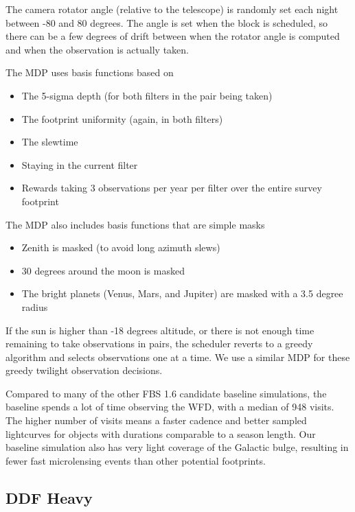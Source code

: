 The camera rotator angle (relative to the telescope) is randomly set each night between -80 and 80 degrees. The angle is set when the block is scheduled, so there can be a few degrees of drift between when the rotator angle is computed and when the observation is actually taken.

The MDP uses basis functions based on
\begin{itemize}
    \item{The 5-sigma depth (for both filters in the pair being taken)}
    \item{The footprint uniformity (again, in both filters)}
    \item{The slewtime}
    \item{Staying in the current filter}
    \item{Rewards taking 3 observations per year per filter over the entire survey footprint} 
\end{itemize}
The MDP also includes basis functions that are simple masks
\begin{itemize}
    \item{Zenith is masked (to avoid long azimuth slews)}
    \item{30 degrees around the moon is masked}
    \item{The bright planets (Venus, Mars, and Jupiter) are masked with a 3.5 degree radius}
\end{itemize}


If the sun is higher than -18 degrees altitude, or there is not enough time remaining to take observations in pairs, the scheduler reverts to a greedy algorithm and selects observations one at a time. We use a similar MDP for these greedy twilight observation decisions. 

Compared to many of the other FBS 1.6 candidate baseline simulations, the baseline spends a lot of time observing the WFD, with a median of 948 visits. The higher number of visits means a faster cadence and better sampled lightcurves for objects with durations comparable to a season length. Our baseline simulation also has very light coverage of the Galactic bulge, resulting in fewer fast microlensing events than other potential footprints. 

\subsection{DDF Heavy}\label{ss:1.6ddfheavy}

